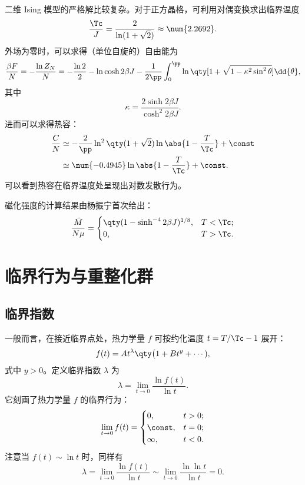 二维 Ising 模型的严格解比较复杂。对于正方晶格，可利用对偶变换求出临界温度
\begin{equation}
  \frac{\Tc}{J} = \frac{2}{\ln(1+\sqrt{2})} \approx \num{2.2692}.
\end{equation}
外场为零时，可以求得（单位自旋的）自由能为
\begin{equation}
  \frac{\beta F}{N}
  = - \frac{\ln Z_N}{N}
  = - \frac{\ln 2}{2} - \ln\cosh 2\beta J
    - \frac{1}{2\pp} \int_0^\pp \ln\qty[1+\sqrt{1-\kappa^2\sin^2\theta}] \dd{\theta},
\end{equation}
其中
\begin{equation}
  \kappa = \frac{2\sinh 2\beta J}{\cosh^2 2\beta J}.
\end{equation}
进而可以求得热容：
\begin{align}
  \label{eq:ising-specific-heat}
  \frac{C}{N}
  & \simeq -\frac{2}{\pp} \ln^2 \qty(1+\sqrt{2}) \ln\abs{1-\frac{T}{\Tc}} + \const \notag \\
  & \simeq \num{-0.4945} \ln\abs{1-\frac{T}{\Tc}} + \const.
\end{align}
可以看到热容在临界温度处呈现出对数发散行为。

磁化强度的计算结果由杨振宁首次给出：
\begin{equation}
  \label{eq:ising-magnetization}
  \frac{\bar{M}}{N\mu} =
  \begin{cases}
    \qty(1 - \sinh^{-4} 2\beta J)^{1/8}, & T<\Tc; \\
    0, & T>\Tc.
  \end{cases}
\end{equation}

\section{临界行为与重整化群}

\subsection{临界指数}

一般而言，在接近临界点处，热力学量 $f$ 可按约化温度 $t=T/\Tc-1$ 展开：
\begin{equation}
  f(t) = A t^\lambda \qty\big(1 + B t^y + \cdots),
\end{equation}
式中 $y>0$。定义临界指数 $\lambda$ 为
\begin{equation}
  \lambda = \lim_{t \to 0} \frac{\ln f(t)}{\ln t}.
\end{equation}
它刻画了热力学量 $f$ 的临界行为：
\begin{equation}
  \lim_{t \to 0} f(t) =
  \begin{cases}
    0,      & t > 0; \\
    \const, & t = 0; \\
    \infty, & t < 0.
  \end{cases}
\end{equation}
注意当 $f(t) \sim \ln t$ 时，同样有
\begin{equation}
  \lambda =    \lim_{t \to 0} \frac{\ln f(t)}{\ln t}
          \sim \lim_{t \to 0} \frac{\ln \ln t}{\ln t} = 0.
\end{equation}

